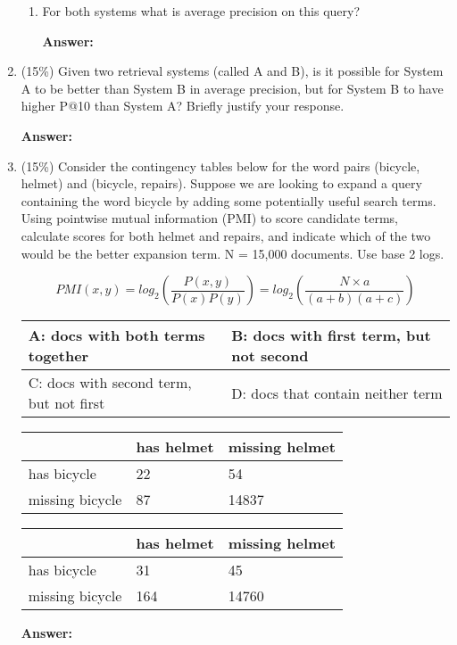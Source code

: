 \documentclass[11pt]{article}
\begin{document}
\begin{enumerate}
\begin{enumerate}
            \item For both systems what is average precision on this query?

            \textbf{Answer:}

        \end{enumerate}

        \item (15\%) Given two retrieval systems (called A and B), is it possible for System A to be better than System B in
        average precision, but for System B to have higher P@10 than System A? Briefly justify your response.

        \textbf{Answer:}

        \item (15\%) Consider the contingency tables below for the word pairs (bicycle, helmet) and (bicycle, repairs). Suppose we are looking to expand a query containing the word bicycle by adding some potentially useful search terms. Using pointwise mutual information (PMI) to score candidate terms, calculate scores for both helmet and repairs, and indicate which of the two would be the better expansion term. N = 15,000 documents. Use base 2 logs.

        \begin{equation*}
            PMI(x,y)=log_2\left(\frac{P(x,y)}{P(x)P(y)}\right)=log_2\left(\frac{N\times a}{(a+b)(a+c)}\right)
        \end{equation*}

        \begin{table}[ht]
            \footnotesize
            \begin{tabular}[t]{|a{1.6cm}|a{1.6cm}|}
                \hline
                A: docs with both terms together & B: docs with first term, but not second
                \\ \hline
                C: docs with second term, but not first & D: docs that contain neither term
                \\ \hline
            \end{tabular}
            \hfill
            \begin{tabular}[t]{|M{1.15cm}|M{1.15cm}|M{1.15cm}|}
                \hline
                & has helmet & missing helmet
                \\ \hline
                has bicycle & 22 & 54
                \\ \hline
                missing bicycle & 87 & 14837
                \\ \hline
            \end{tabular}
            \hfill
            \begin{tabular}[t]{|M{1.15cm}|M{1.15cm}|M{1.15cm}|}
                \hline
                & has helmet & missing helmet
                \\ \hline
                has bicycle & 31 & 45
                \\ \hline
                missing bicycle & 164 & 14760
                \\ \hline
            \end{tabular}
        \end{table}

        \textbf{Answer:}

    \end{enumerate}
\end{document}
